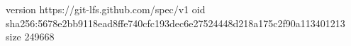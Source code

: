 version https://git-lfs.github.com/spec/v1
oid sha256:5678e2bb9118ead8ffe740cfc193dec6e27524448d218a175c2f90a113401213
size 249668
